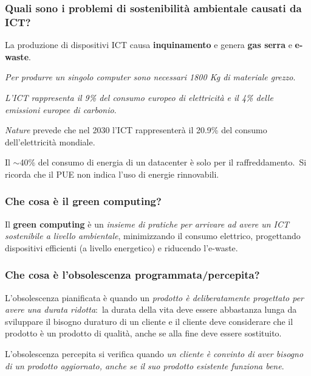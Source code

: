 \documentclass[12pt, a4paper]{article}
\begin{document}
\subsubsection*{Quali sono i problemi di sostenibilità ambientale causati da ICT?}
La produzione di dispositivi ICT causa \textbf{inquinamento} e genera \textbf{gas serra} e \textbf{e-waste}.\

\begin{flushleft}
	\textit{Per produrre un singolo computer sono necessari 1800 Kg di materiale grezzo}.
\end{flushleft}

\begin{flushleft}
	\textit{L'ICT rappresenta il 9\% del consumo europeo di elettricità e il 4\% delle emissioni europee di carbonio}.
\end{flushleft}

\noindent \textit{Nature} prevede che nel 2030 l'ICT rappresenterà il 20.9\% del consumo dell'elettricità mondiale.

Il $\sim$40\% del consumo di energia di un datacenter è solo per il raffreddamento.\
Si ricorda che il PUE non indica l'uso di energie rinnovabili.

\subsubsection*{Che cosa è il green computing?}
Il \textbf{green computing} è un \textit{insieme di pratiche per arrivare ad avere un ICT sostenibile a livello ambientale}, minimizzando il consumo elettrico, progettando dispositivi efficienti (a livello energetico) e riducendo l'e-waste.\

\subsubsection*{Che cosa è l'obsolescenza programmata/percepita?}

L'obsolescenza pianificata è quando un \textit{prodotto è deliberatamente progettato per avere una durata ridotta}:\ la durata della vita deve essere abbastanza lunga da sviluppare il bisogno duraturo di un cliente e il cliente deve considerare che il prodotto è un prodotto di qualità, anche se alla fine deve essere sostituito.

L'obsolescenza percepita si verifica quando \textit{un cliente è convinto di aver bisogno di un prodotto aggiornato, anche se il suo prodotto esistente funziona bene}.
\end{document}
